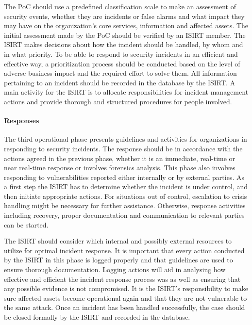 The PoC should use a predefined classification scale to make an assessment of security events, whether they are incidents or false alarms and what impact they may have on the organization's core services, information and affected assets. The initial assessment made by the PoC should be verified by an \ac{ISIRT} member. The \ac{ISIRT} makes decisions about how the incident should be handled, by whom and in what priority. To be able to respond to security incidents in an efficient and effective way, a prioritization process should be conducted based on the level of adverse business impact and the required effort to solve them.  All information pertaining to an incident should be recorded in the database by the \ac{ISIRT}. A main activity for the \ac{ISIRT} is to allocate responsibilities for incident management actions and provide thorough and structured procedures for people involved. 

\paragraph{Responses} The third operational phase presents guidelines and activities for organizations in responding to security incidents. The response should be in accordance with the actions agreed in the previous phase, whether it is an immediate, real-time or near real-time response or involves forensics analysis. This phase also involves responding to vulnerabilities reported either internally or by external parties. As a first step the \ac{ISIRT} has to determine whether the incident is under control, and then initiate appropriate actions. For situations out of control, escalation to crisis handling might be necessary for further assistance. Otherwise, response activities including recovery, proper documentation and communication to relevant parties can be started. 

The \ac{ISIRT} should consider which internal and possibly external resources to utilize for optimal incident response. It is important that every action conducted by the \ac{ISIRT} in this phase is logged properly and that guidelines are used to ensure thorough documentation. Logging actions will aid in analysing how effective and efficient the incident response process was as well as ensuring that any possible evidence is not compromised. It is the \ac{ISIRT}'s responsibility to make sure affected assets become operational again and that they are not vulnerable to the same attack. Once an incident has been handled successfully, the case should be closed formally by the \ac{ISIRT} and recorded in the database.

